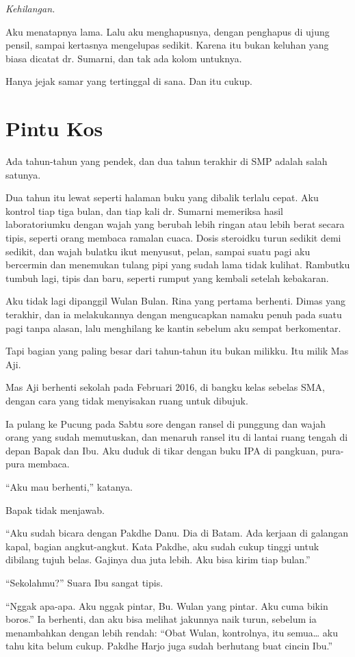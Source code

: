 \documentclass[11pt,twoside,openany]{book}
\makeatletter
\newcommand{\scenebreak}{\par\vspace{0.9em}{\centering\textsc{*\hspace{0.7em}*\hspace{0.7em}*}\par}\vspace{0.9em}\@afterindentfalse\@afterheading}
\makeatother
\begin{document}
\emph{Kehilangan.}

Aku menatapnya lama. Lalu aku menghapusnya, dengan penghapus di ujung pensil, sampai kertasnya mengelupas sedikit. Karena itu bukan keluhan yang biasa dicatat dr. Sumarni, dan tak ada kolom untuknya.

Hanya jejak samar yang tertinggal di sana. Dan itu cukup.

\chapter{Pintu Kos}
Ada tahun-tahun yang pendek, dan dua tahun terakhir di SMP adalah salah satunya.

Dua tahun itu lewat seperti halaman buku yang dibalik terlalu cepat. Aku kontrol tiap tiga bulan, dan tiap kali dr. Sumarni memeriksa hasil laboratoriumku dengan wajah yang berubah lebih ringan atau lebih berat secara tipis, seperti orang membaca ramalan cuaca. Dosis steroidku turun sedikit demi sedikit, dan wajah bulatku ikut menyusut, pelan, sampai suatu pagi aku bercermin dan menemukan tulang pipi yang sudah lama tidak kulihat. Rambutku tumbuh lagi, tipis dan baru, seperti rumput yang kembali setelah kebakaran.

Aku tidak lagi dipanggil Wulan Bulan. Rina yang pertama berhenti. Dimas yang terakhir, dan ia melakukannya dengan mengucapkan namaku penuh pada suatu pagi tanpa alasan, lalu menghilang ke kantin sebelum aku sempat berkomentar.

Tapi bagian yang paling besar dari tahun-tahun itu bukan milikku. Itu milik Mas Aji.

\scenebreak
Mas Aji berhenti sekolah pada Februari 2016, di bangku kelas sebelas SMA, dengan cara yang tidak menyisakan ruang untuk dibujuk.

Ia pulang ke Pucung pada Sabtu sore dengan ransel di punggung dan wajah orang yang sudah memutuskan, dan menaruh ransel itu di lantai ruang tengah di depan Bapak dan Ibu. Aku duduk di tikar dengan buku IPA di pangkuan, pura-pura membaca.

``Aku mau berhenti,'' katanya.

Bapak tidak menjawab.

``Aku sudah bicara dengan Pakdhe Danu. Dia di Batam. Ada kerjaan di galangan kapal, bagian angkut-angkut. Kata Pakdhe, aku sudah cukup tinggi untuk dibilang tujuh belas. Gajinya dua juta lebih. Aku bisa kirim tiap bulan.''

``Sekolahmu?'' Suara Ibu sangat tipis.

``Nggak apa-apa. Aku nggak pintar, Bu. Wulan yang pintar. Aku cuma bikin boros.'' Ia berhenti, dan aku bisa melihat jakunnya naik turun, sebelum ia menambahkan dengan lebih rendah: ``Obat Wulan, kontrolnya, itu semua\ldots{} aku tahu kita belum cukup. Pakdhe Harjo juga sudah berhutang buat cincin Ibu.''
\end{document}
